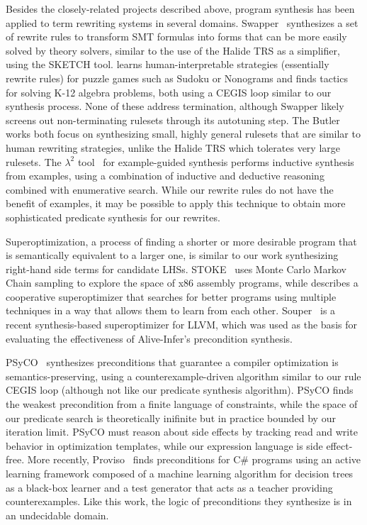 \documentclass[acmsmall,review]{acmart}\settopmatter{printfolios=true,printccs=false,printacmref=false}
\begin{document}
Besides the closely-related projects described above, program synthesis has been applied to term rewriting systems in several domains. Swapper~\cite{singh2016swapper} synthesizes a set of rewrite rules to transform SMT formulas into forms that can be more easily solved by theory solvers, similar to the use of the Halide TRS as a simplifier, using the SKETCH tool. \citet{butler2017synthesizing} learns human-interpretable strategies (essentially rewrite rules) for puzzle games such as Sudoku or Nonograms and \citet{butler2018framework} finds tactics for solving K-12 algebra problems, both using a CEGIS loop similar to our synthesis process. None of these address termination, although Swapper likely screens out non-terminating rulesets through its autotuning step. The Butler works both focus on synthesizing small, highly general rulesets that are similar to human rewriting strategies, unlike the Halide TRS which tolerates very large rulesets. The \textbf{$\lambda^2$} tool~\cite{feser2015lambda} for example-guided synthesis performs inductive synthesis from examples, using a combination of inductive and deductive reasoning combined with enumerative search.  While our rewrite rules do not have the benefit of examples, it may be possible to apply this technique to obtain more sophisticated predicate synthesis for our rewrites.

Superoptimization, a process of finding a shorter or more desirable program that is semantically equivalent to a larger one, is similar to our work synthesizing right-hand side terms for candidate LHSs. STOKE~\cite{schkufza2013stochastic} uses Monte Carlo Markov Chain sampling to explore the space of x86 assembly programs, while \citet{phothilimthana2016scaling} describes a cooperative superoptimizer that searches for better programs using multiple techniques in a way that allows them to learn from each other.  Souper~\cite{sasnauskas2017souper} is a recent synthesis-based superoptimizer for LLVM, which was used as the basis for evaluating the effectiveness of Alive-Infer's{} precondition synthesis.

PSyCO~\cite{lopes2014weakest} synthesizes preconditions that guarantee a compiler optimization is semantics-preserving, using a counterexample-driven algorithm similar to our rule CEGIS loop (although not like our predicate synthesis algorithm). PSyCO finds the weakest precondition from a finite language of constraints, while the space of our predicate search is theoretically inifinite but in practice bounded by our iteration limit. PSyCO must reason about side effects by tracking read and write behavior in optimization templates, while our expression language is side effect-free. More recently, Proviso~\cite{astorga2019learning} finds preconditions for C\# programs using an active learning framework composed of a machine learning algorithm for decision trees as a black-box learner and a test generator that acts as a teacher providing counterexamples. Like this work, the logic of preconditions they synthesize is in an undecidable domain.
\end{document}
